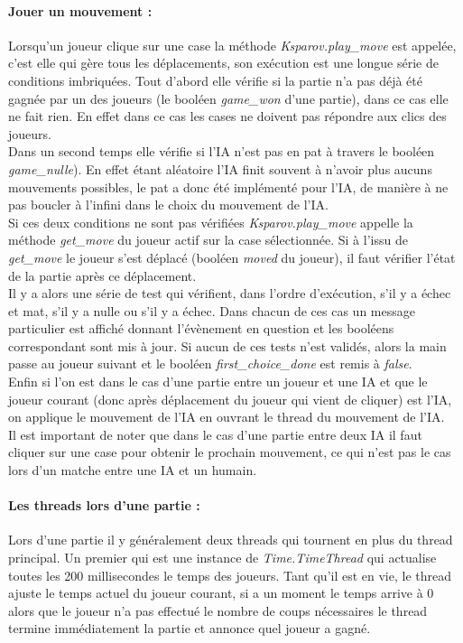 \documentclass[a4paper]{article}
\begin{document}
\paragraph{Jouer un mouvement :}Lorsqu'un joueur clique sur une case la méthode \textit{Ksparov.play\_move} est appelée, c'est elle qui gère tous les déplacements, son exécution est une longue série de conditions imbriquées. Tout d'abord elle vérifie si la partie n'a pas déjà été gagnée par un des joueurs (le booléen \textit{game\_won} d'une partie), dans ce cas elle ne fait rien. En effet dans ce cas les cases ne doivent pas répondre aux clics des joueurs. \\

Dans un second temps elle vérifie si l'IA n'est pas en pat à travers le booléen \textit{game\_nulle}). En effet étant aléatoire l'IA finit souvent à n'avoir plus aucuns mouvements possibles, le pat a donc été implémenté pour l'IA, de manière à ne pas boucler à l'infini dans le choix du mouvement de l'IA. \\

Si ces deux conditions ne sont pas vérifiées \textit{Ksparov.play\_move} appelle la méthode \textit{get\_move} du joueur actif sur la case sélectionnée. Si à l'issu de \textit{get\_move} le joueur s'est déplacé (booléen \textit{moved} du joueur), il faut vérifier l'état de la partie après ce déplacement. \\ 

Il y a alors une série de test qui vérifient, dans l'ordre d'exécution, s'il y a échec et mat, s'il y a nulle ou s'il y a échec. Dans chacun de ces cas un message particulier est affiché donnant l'évènement en question et les booléens correspondant sont mis à jour. Si aucun de ces tests n'est validés, alors la main passe au joueur suivant et le booléen \textit{first\_choice\_done} est remis à \textit{false}.\\

Enfin si l'on est dans le cas d'une partie entre un joueur et une IA et que le joueur courant (donc après déplacement du joueur qui vient de cliquer) est l'IA, on applique le mouvement de l'IA en ouvrant le thread du mouvement de l'IA. \\ 

Il est important de noter que dans le cas d'une partie entre deux IA il faut cliquer sur une case pour obtenir le prochain mouvement, ce qui n'est pas le cas lors d'un matche entre une IA et un humain. 

\paragraph{Les threads lors d'une partie :}Lors d'une partie il y généralement deux threads qui tournent en plus du thread principal. Un premier qui est une instance de \textit{Time.TimeThread} qui actualise toutes les 200 millisecondes le temps des joueurs. Tant qu'il est en vie, le thread ajuste le temps actuel du joueur courant, si a un moment le temps arrive à 0 alors que le joueur n'a pas effectué le nombre de coups nécessaires le thread termine immédiatement la partie et annonce quel joueur a gagné. \\
\end{document}
